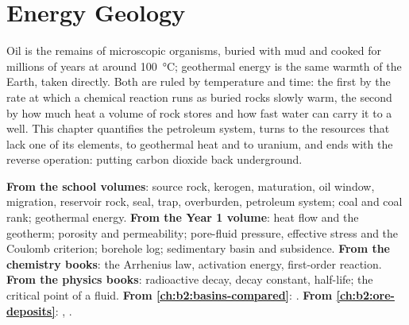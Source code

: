 \chapter{Energy Geology}\label{ch:b2:energy-geology}

Oil is the remains of microscopic organisms, buried with mud and cooked for millions of years at
around \qty{100}{\celsius}; geothermal energy is the same warmth of the Earth, taken directly.
Both are ruled by temperature and time: the first by the rate at which a chemical reaction runs as
buried rocks slowly warm, the second by how much heat a volume of rock stores and how fast water
can carry it to a well. This chapter quantifies the petroleum system, turns to the resources that
lack one of its elements, to geothermal heat and to uranium, and ends with the reverse operation:
putting carbon dioxide back underground.

\begin{recall}
\textbf{From the school volumes}: source rock, kerogen, maturation, oil window, migration,
reservoir rock, seal, trap, overburden, petroleum system; coal and coal rank; geothermal energy.
\textbf{From the Year 1 volume}: heat flow and the geotherm; porosity and permeability; pore-fluid
pressure, effective stress and the Coulomb criterion; borehole log; sedimentary basin and
subsidence. \textbf{From the chemistry books}: the Arrhenius law, activation energy, first-order
reaction. \textbf{From the physics books}: radioactive decay, decay constant, half-life; the
critical point of a fluid. \textbf{From \cref{ch:b2:basins-compared}}: .
\textbf{From \cref{ch:b2:ore-deposits}}: , .
\end{recall}

